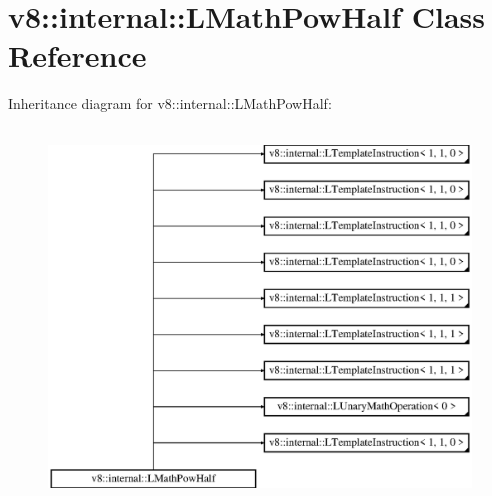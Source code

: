 \hypertarget{classv8_1_1internal_1_1_l_math_pow_half}{}\section{v8\+:\+:internal\+:\+:L\+Math\+Pow\+Half Class Reference}
\label{classv8_1_1internal_1_1_l_math_pow_half}
Inheritance diagram for v8\+:\+:internal\+:\+:L\+Math\+Pow\+Half\+:\begin{figure}[H]
\begin{center}
\leavevmode
\includegraphics[height=10.000000cm]{classv8_1_1internal_1_1_l_math_pow_half}
\end{center}
\end{figure}
